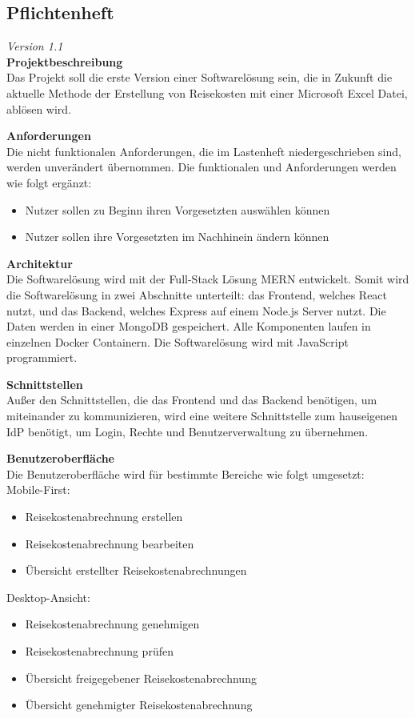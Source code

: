 \subsection{Pflichtenheft}
\label{sec:Anhang:Pflichtenheft}
\textit{Version 1.1}\\

\textbf{Projektbeschreibung}\\
Das Projekt soll die erste Version einer Softwarelösung sein, die in Zukunft die aktuelle Methode der Erstellung von Reisekosten mit einer Microsoft Excel Datei, ablösen wird.

\textbf{Anforderungen}\\
Die nicht funktionalen Anforderungen, die im Lastenheft niedergeschrieben sind, werden unverändert übernommen. Die funktionalen und Anforderungen werden wie folgt ergänzt:
\begin{itemize}
\item Nutzer sollen zu Beginn ihren Vorgesetzten auswählen können
\item Nutzer sollen ihre Vorgesetzten im Nachhinein ändern können
\end{itemize}

\textbf{Architektur}\\
Die Softwarelösung wird mit der Full-Stack Lösung MERN entwickelt.
Somit wird die Softwarelösung in zwei Abschnitte unterteilt: das Frontend, welches React nutzt, und das Backend, welches Express auf einem Node.js Server nutzt. Die Daten werden in einer MongoDB gespeichert.
Alle Komponenten laufen in einzelnen Docker Containern.
Die Softwarelösung wird mit JavaScript programmiert.

\textbf{Schnittstellen}\\
Außer den Schnittstellen, die das Frontend und das Backend benötigen, um miteinander zu kommunizieren, wird eine weitere Schnittstelle zum hauseigenen IdP benötigt, um Login, Rechte und Benutzerverwaltung zu übernehmen.

\textbf{Benutzeroberfläche}\\
Die Benutzeroberfläche wird für bestimmte Bereiche wie folgt umgesetzt:\\
Mobile-First:
\begin{itemize}
\item Reisekostenabrechnung erstellen
\item Reisekostenabrechnung bearbeiten
\item Übersicht erstellter Reisekostenabrechnungen
\end{itemize}
Desktop-Ansicht:\\
\begin{itemize}
\item Reisekostenabrechnung genehmigen
\item Reisekostenabrechnung prüfen
\item Übersicht freigegebener Reisekostenabrechnung 
\item Übersicht genehmigter Reisekostenabrechnung
\end{itemize}

